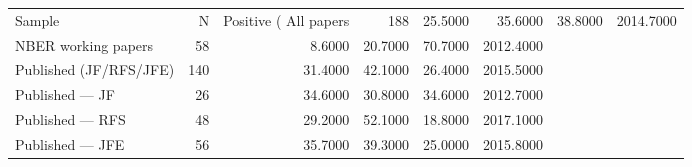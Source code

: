 \begin{tabular}{lrrrrr}
\toprule
Sample & N & Positive (%
\midrule
All papers & 188 & 25.5000 & 35.6000 & 38.8000 & 2014.7000 \\
NBER working papers & 58 & 8.6000 & 20.7000 & 70.7000 & 2012.4000 \\
Published (JF/RFS/JFE) & 140 & 31.4000 & 42.1000 & 26.4000 & 2015.5000 \\
Published — JF & 26 & 34.6000 & 30.8000 & 34.6000 & 2012.7000 \\
Published — RFS & 48 & 29.2000 & 52.1000 & 18.8000 & 2017.1000 \\
Published — JFE & 56 & 35.7000 & 39.3000 & 25.0000 & 2015.8000 \\
\bottomrule
\end{tabular}
